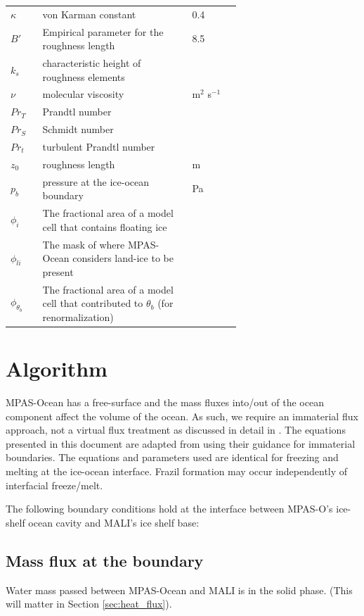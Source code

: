 \documentclass[11pt]{report}
\begin{document}
\begin{tabularx}{\linewidth}{l|p{0.65\linewidth}|X}
    $\kappa$ & von Karman constant & 0.4 \\
    $B'$ & Empirical parameter for the roughness length & 8.5 \\
    $k_s$ & characteristic height of roughness elements\\
    $\nu$ & molecular viscosity & m$^2$ s$^{-1}$\\
    $Pr_T$ & Prandtl number & \\
    $Pr_S$ & Schmidt number & \\
    $Pr_t$ & turbulent Prandtl number & \\
    $z_0$ & roughness length & m\\
    $p_b$ & pressure at the ice-ocean boundary & Pa \\
    $\phi_i$ & The fractional area of a model cell that contains floating ice & \\
    $\phi_{li}$ & The mask of where MPAS-Ocean considers land-ice to be present & \\
    $\phi_{\theta_b}$ & The fractional area of a model cell that contributed to $\theta_b$ (for renormalization) &
\end{tabularx}

\section{Algorithm}

MPAS-Ocean has a free-surface and the mass fluxes into/out of the ocean component affect the volume of the ocean. As such, we require an immaterial flux approach, not a virtual flux treatment as discussed in detail in \cite{jenkins_role_2001}. The equations presented in this document are adapted from \cite{burchard_vertical_2022} using their guidance for immaterial boundaries. The equations and parameters used are identical for freezing and melting at the ice-ocean interface. Frazil formation may occur independently of interfacial freeze/melt.

The following boundary conditions hold at the interface between MPAS-O's ice-shelf ocean cavity and MALI's ice shelf base:

\subsection{Mass flux at the boundary}

Water mass passed between MPAS-Ocean and MALI is in the solid phase. (This will matter in Section \ref{sec:heat_flux}).
\end{document}
